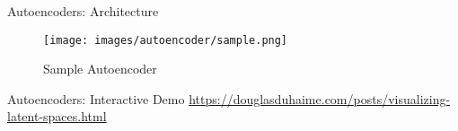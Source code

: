 \begin{frame}[allowframebreaks]{Autoencoders: Architecture}
\framebreak

\begin{figure}
    \centering
    \texttt{[image: images/autoencoder/sample.png]}
    \caption{Sample Autoencoder}
\end{figure}
\end{frame}

\begin{frame}{Autoencoders: Interactive Demo}
    \centering
    \href{https://douglasduhaime.com/posts/visualizing-latent-spaces.html}{https://douglasduhaime.com/posts/visualizing-latent-spaces.html}
\end{frame}